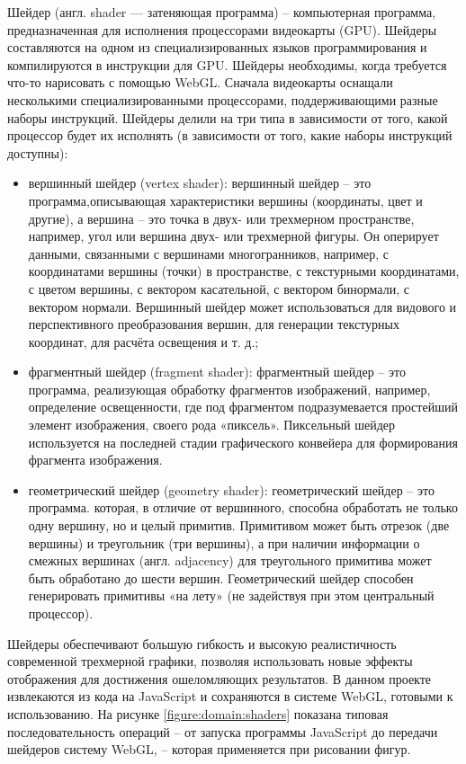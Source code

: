 Шейдер (англ. shader — затеняющая программа) -- компьютерная программа, предназначенная для исполнения процессорами видеокарты (GPU).
Шейдеры составляются на одном из специализированных языков программирования и компилируются в инструкции для GPU. Шейдеры необходимы, когда требуется что-то нарисовать
с помощью WebGL. 
Сначала видеокарты оснащали несколькими специализированными процессорами, поддерживающими разные наборы инструкций. Шейдеры делили на три типа в зависимости от того,
какой процессор будет их исполнять (в зависимости от того, какие наборы инструкций доступны):
\begin{itemize}
\item вершинный шейдер (vertex shader): вершинный шейдер -- это программа,описывающая характеристики вершины (координаты, цвет и другие), а вершина – это точка в двух- или 
трехмерном пространстве, например, угол или вершина двух- или трехмерной фигуры. Он оперирует данными, связанными с вершинами многогранников, например, с координатами вершины 
(точки) в пространстве, с текстурными координатами, с цветом вершины, с вектором касательной, с вектором бинормали, с вектором нормали. Вершинный шейдер может использоваться 
для видового и перспективного преобразования вершин, для генерации текстурных координат, для расчёта освещения и т. д.;
\item фрагментный шейдер (fragment shader): фрагментный шейдер -- это программа, реализующая обработку фрагментов изображений, например, определение освещенности, где под
фрагментом подразумевается простейший элемент изображения, своего рода «пиксель». Пиксельный шейдер используется на последней стадии графического конвейера для формирования фрагмента изображения.
\item геометрический шейдер (geometry shader): геометрический шейдер -- это программа. которая, в отличие от вершинного, способна обработать не только одну вершину, но и целый примитив. 
Примитивом может быть отрезок (две вершины) и треугольник (три вершины), а при наличии информации о смежных вершинах (англ. adjacency) для треугольного примитива может быть обработано до шести вершин. Геометрический шейдер 
способен генерировать примитивы «на лету» (не задействуя при этом центральный процессор).
\end{itemize}

Шейдеры обеспечивают большую гибкость и высокую реалистичность современной трехмерной графики, позволяя использовать новые эффекты отображения для достижения ошеломляющих
результатов. В данном проекте извлекаются из кода на JavaScript и сохраняются в системе WebGL, готовыми к использованию. На рисунке \ref{figure:domain:shaders} показана типовая последовательность
операций – от запуска программы JavaScript до передачи шейдеров систему WebGL, – которая применяется при рисовании фигур.

